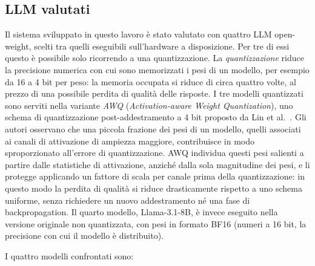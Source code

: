 \subsection{LLM valutati}

Il sistema sviluppato in questo lavoro è stato valutato con quattro LLM open-weight, scelti tra
quelli eseguibili sull'hardware a disposizione. Per tre di essi questo è possibile solo ricorrendo a una
quantizzazione. La \emph{quantizzazione} riduce la precisione numerica con cui sono memorizzati i pesi di un modello,
per esempio da 16 a 4 bit per peso: la memoria occupata si riduce di circa quattro volte, al prezzo di una possibile
perdita di qualità delle risposte. I tre modelli quantizzati sono serviti nella variante \emph{AWQ}
(\emph{Activation-aware Weight Quantization}), uno
schema di quantizzazione post-addestramento a 4 bit proposto da Lin et al.\ \cite{lin2024awq}. Gli autori osservano
che una piccola frazione dei pesi di un modello, quelli associati ai canali di attivazione di ampiezza maggiore,
contribuisce in modo sproporzionato all'errore di quantizzazione. AWQ individua questi pesi salienti a partire dalle
statistiche di attivazione, anziché dalla sola magnitudine dei pesi, e li protegge applicando un fattore di scala
per canale prima della quantizzazione: in questo modo la perdita di qualità si riduce drasticamente rispetto a uno
schema uniforme, senza richiedere un nuovo addestramento né una fase di backpropagation. Il quarto modello,
Llama-3.1-8B, è invece eseguito nella versione originale non quantizzata, con pesi in formato BF16 (numeri a 16 bit, la precisione con cui il modello è distribuito).

I quattro modelli confrontati sono:

